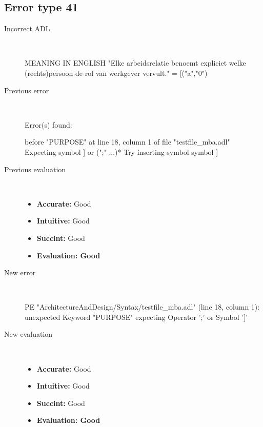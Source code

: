 \hrulefill

\subsection{Error type 41}
  \begin{description}
  \item[Incorrect ADL]~\\
\begin{adl}
MEANING IN ENGLISH "Elke arbeidsrelatie benoemt expliciet welke (rechts)persoon de rol van werkgever vervult."
= [("a","0")\end{adl}
  \item[Previous error]~\\
\begin{haskell}
Error(s) found:

before "PURPOSE" at line 18, column 1 of file "testfile_mba.adl"
Expecting symbol ] or (";" ...)*
Try inserting symbol symbol ]

\end{haskell}
  \item[Previous evaluation]~\\
    \begin{itemize}
    \item \textbf{Accurate:} Good
    \item \textbf{Intuitive:} Good
    \item \textbf{Succint:} Good
    \item \textbf{Evaluation: Good}
    \end{itemize}
  \item[New error]~\\
\begin{haskell}
PE "ArchitectureAndDesign/Syntax/testfile_mba.adl" (line 18, column 1):
unexpected Keyword "PURPOSE"
expecting Operator ';' or Symbol ']'\end{haskell}
  \item[New evaluation]~\\
    \begin{itemize}
    \item \textbf{Accurate:} Good
    \item \textbf{Intuitive:} Good
    \item \textbf{Succint:} Good
    \item \textbf{Evaluation: Good
}
    \end{itemize}
  \end{description}

\hrulefill


